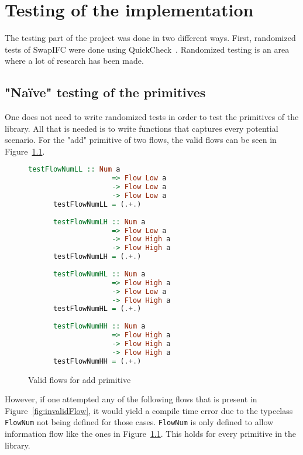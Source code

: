 \chapter{Testing of the implementation}
\label{chapter:testing}
The testing part of the project was done in two different ways. First, randomized tests of SwapIFC were done using QuickCheck~\cite{quickcheck, quickcheck-wiki}. Randomized testing is an area where a lot of research has been made.
\section{"Naïve" testing of the primitives}
One does not need to write randomized tests in order to test the primitives of the library. All that is needed is to write functions that captures every potential scenario. For the "add" primitive of two flows, the valid flows can be seen in Figure~\ref{fig:validFlow}.
\begin{figure}[h]
  \begin{center}
    \begin{lstlisting}[language=Haskell]
      testFlowNumLL :: Num a
                    => Flow Low a
                    -> Flow Low a
                    -> Flow Low a
      testFlowNumLL = (.+.)
    
      testFlowNumLH :: Num a
                    => Flow Low a
                    -> Flow High a
                    -> Flow High a
      testFlowNumLH = (.+.)
    
      testFlowNumHL :: Num a
                    => Flow High a
                    -> Flow Low a
                    -> Flow High a
      testFlowNumHL = (.+.)
    
      testFlowNumHH :: Num a
                    => Flow High a
                    -> Flow High a
                    -> Flow High a
      testFlowNumHH = (.+.)
    \end{lstlisting}
  \end{center}
  \caption{Valid flows for add primitive}
  \label{fig:validFlow}
\end{figure}
However, if one attempted any of the following flows that is present in Figure~\ref{fig:invalidFlow}, it would yield a compile time error due to the typeclass {\tt FlowNum} not being defined for those cases. {\tt FlowNum} is only defined to allow information flow like the ones in Figure~\ref{fig:validFlow}. This holds for every primitive in the library.
